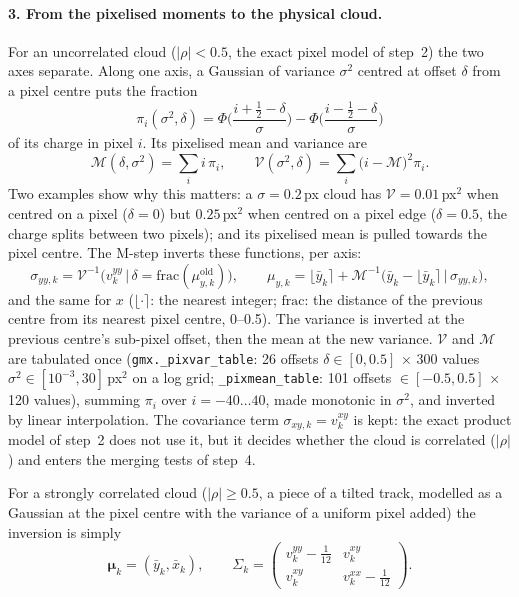\documentclass[11pt,a4paper]{article}
\newcommand{\code}[1]{\texttt{#1}}
\begin{document}
\paragraph{3. From the pixelised moments to the physical cloud.} For an uncorrelated cloud ($|\rho|<0.5$, the exact pixel model
of step~2) the two axes separate. Along one axis, a Gaussian of variance $\sigma^2$ centred at offset $\delta$ from a pixel centre
puts the fraction
\begin{equation}
\pi_i(\sigma^2,\delta)=\Phi\Big(\frac{i+\frac12-\delta}{\sigma}\Big)-\Phi\Big(\frac{i-\frac12-\delta}{\sigma}\Big)
\end{equation}
of its charge in pixel $i$. Its pixelised mean and variance are
\begin{equation}
\mathcal M(\delta,\sigma^2)=\sum_i i\,\pi_i,\qquad \mathcal V(\sigma^2,\delta)=\sum_i\big(i-\mathcal M\big)^2\pi_i .
\end{equation}
Two examples show why this matters: a $\sigma=0.2$\,px cloud has $\mathcal V=0.01$\,px$^2$ when centred on a pixel ($\delta=0$)
but $0.25$\,px$^2$ when centred on a pixel edge ($\delta=0.5$, the charge splits between two pixels); and its pixelised mean is
pulled towards the pixel centre. The M-step inverts these functions, per axis:
\begin{equation}
\sigma_{yy,k}=\mathcal V^{-1}\big(v^{yy}_k\,\big|\,\delta=\mathrm{frac}(\mu_{y,k}^\mathrm{old})\big),\qquad
\mu_{y,k}=\lfloor\bar y_k\rceil+\mathcal M^{-1}\big(\bar y_k-\lfloor\bar y_k\rceil\,\big|\,\sigma_{yy,k}\big),
\end{equation}
and the same for $x$ ($\lfloor\cdot\rceil$: the nearest integer; $\mathrm{frac}$: the distance of the previous centre from its
nearest pixel centre, 0--0.5). The variance is inverted at the previous centre's sub-pixel offset, then the mean at the new
variance. $\mathcal V$ and $\mathcal M$ are tabulated once (\code{gmx.\_pixvar\_table}: 26 offsets $\delta\in[0,0.5]$ $\times$ 300
values $\sigma^2\in[10^{-3},30]$\,px$^2$ on a log grid; \code{\_pixmean\_table}: 101 offsets $\in[-0.5,0.5]$ $\times$ 120 values),
summing $\pi_i$ over $i=-40\dots40$, made monotonic in $\sigma^2$, and inverted by linear interpolation. The covariance term
$\sigma_{xy,k}=v^{xy}_k$ is kept: the exact product model of step~2 does not use it, but it decides whether the cloud is
correlated ($|\rho|$) and enters the merging tests of step~4.

For a strongly correlated cloud ($|\rho|\ge0.5$, a piece of a tilted track, modelled as a Gaussian at the pixel centre with the
variance of a uniform pixel added) the inversion is simply
\begin{equation}
\bm\mu_k=(\bar y_k,\bar x_k),\qquad
\Sigma_k=\begin{pmatrix}v^{yy}_k-\tfrac1{12}&v^{xy}_k\\ v^{xy}_k&v^{xx}_k-\tfrac1{12}\end{pmatrix}.
\end{equation}
\end{document}
